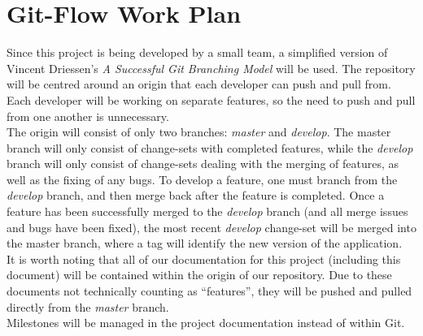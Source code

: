 \documentclass{article}
\begin{document}
\section{Git-Flow Work Plan}
Since this project is being developed by a small team, a simplified version of Vincent Driessen’s \textit{A Successful Git Branching Model}\cite{Git} will be used. The repository will be centred around an origin that each developer can push and pull from. Each developer will be working on separate features, so the need to push and pull from one another is unnecessary.\\ 
The origin will consist of only two branches: \textit{master} and \textit{develop}. The master branch will only consist of change-sets with completed features, while the \textit{develop} branch will only consist of change-sets dealing with the merging of features, as well as the fixing of any bugs. To develop a feature, one must branch from the \textit{develop} branch, and then merge back after the feature is completed. Once a feature has been successfully merged to the \textit{develop} branch (and all merge issues and bugs have been fixed), the most recent \textit{develop} change-set will be merged into the master branch, where a tag will identify the new version of the application.\\
It is worth noting that all of our documentation for this project (including this document) will be contained within the origin of our repository. Due to these documents not technically counting as “features”, they will be pushed and pulled directly from the \textit{master} branch.\\
Milestones will be managed in the project documentation instead of within Git.
\end{document}
